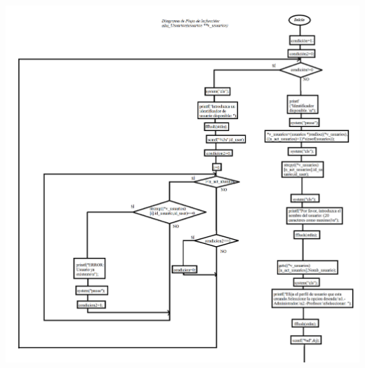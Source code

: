 \documentclass{book}
\begin{document}
\begin{center}
\includegraphics[scale=0.38]{CDF1.png}
\end{center}
\newpage
\end{document}
